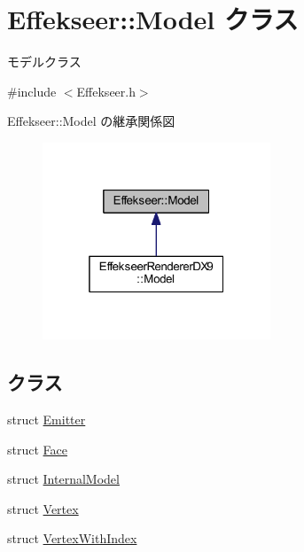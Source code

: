 \hypertarget{class_effekseer_1_1_model}{}\section{Effekseer\+:\+:Model クラス}
\label{class_effekseer_1_1_model}


モデルクラス  




{\ttfamily \#include $<$Effekseer.\+h$>$}



Effekseer\+:\+:Model の継承関係図\nopagebreak
\begin{figure}[H]
\begin{center}
\leavevmode
\includegraphics[width=193pt]{class_effekseer_1_1_model__inherit__graph}
\end{center}
\end{figure}
\subsection*{クラス}
\begin{DoxyCompactItemize}
\item 
struct \mbox{\hyperlink{struct_effekseer_1_1_model_1_1_emitter}{Emitter}}
\item 
struct \mbox{\hyperlink{struct_effekseer_1_1_model_1_1_face}{Face}}
\item 
struct \mbox{\hyperlink{struct_effekseer_1_1_model_1_1_internal_model}{Internal\+Model}}
\item 
struct \mbox{\hyperlink{struct_effekseer_1_1_model_1_1_vertex}{Vertex}}
\item 
struct \mbox{\hyperlink{struct_effekseer_1_1_model_1_1_vertex_with_index}{Vertex\+With\+Index}}
\end{DoxyCompactItemize}
